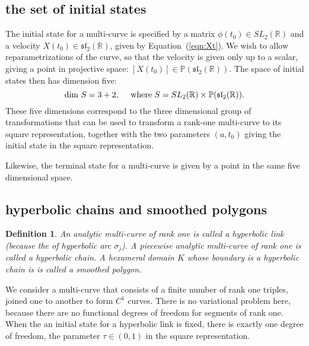 \documentclass[11pt]{amsart}
\newtheorem{definition}{Definition}
\newcommand{\ring}[1]{\mathbb{#1}}
\def\ta{{\tau}}
\begin{document}
\subsection{the set of initial states}



The initial state for a multi-curve is specified by a matrix
$\phi(t_0)\in SL_2(\ring{R})$ and a velocity $X(t_0)\in\mathfrak{sl}_2(\ring{R})$, given by Equation~(\ref{eqn:Xt}).  We wish to allow reparametrizations of the curve, so that the velocity is
given only up to a scalar, giving a point in projective space: $[X(t_0)]\in\ring{P}(\mathfrak{sl}_2(\ring{R}))$.
The space of initial states then has dimension five:
  $$\dim\, S = 3 + 2,\quad\hbox{ where } S = SL_2(\ring{R}) \times\ring{P}(\mathfrak{sl}_2(\ring{R})).$$
These five dimensions correspond to the three dimensional group of
transformations that can be used to transform a rank-one multi-curve
to its square representation, together with the two parameters $(a,t_0)$
giving the initial state in the square representation.

Likewise, the terminal state for a multi-curve is given by a point
in the same five dimensional space. 





\subsection{hyperbolic chains and smoothed polygons}

\begin{definition}
An analytic multi-curve of rank one is called a {\it hyperbolic link} (because the of hyperbolic arc $\sigma_j$).  A piecewise analytic
multi-curve of rank one is called a 
{\it hyperbolic chain}.
A hexameral domain $K$ whose boundary is a hyperbolic chain is
 is called a smoothed polygon.
\end{definition}

We consider a multi-curve that consists of a finite number of rank one triples, joined one to another to form $C^1$ curves.
There is no variational problem here, because there are no functional degrees of freedom for segments of rank one.  When the an initial state for a 
hyperbolic link is fixed, there is exactly one degree of freedom, 
the parameter $\ta\in(0,1)$
in the square representation.
\end{document}
